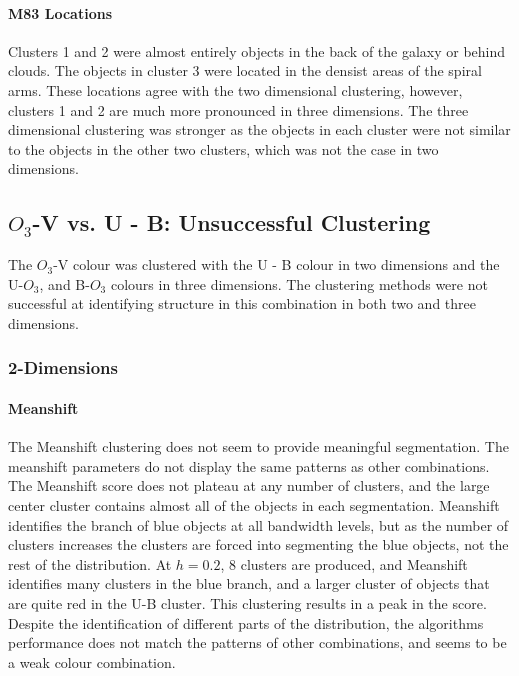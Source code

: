 \paragraph{M83 Locations}
Clusters 1 and 2 were almost entirely objects in the back of the galaxy or behind clouds.
The objects in cluster 3 were located in the densist areas of the spiral arms.
These locations agree with the two dimensional clustering, however, clusters 1 and 2 are much more pronounced in three dimensions.
The three dimensional clustering was stronger as the objects in each cluster were not similar to the objects in the other two clusters, which was not the case in two dimensions.

\subsection{$O_{3}$-V vs. U - B: Unsuccessful Clustering}
The $O_{3}$-V colour was clustered with the U - B colour in two dimensions and the U-$O_{3}$, and B-$O_{3}$ colours in three dimensions.
The clustering methods were not successful at identifying structure in this combination in both two and three dimensions.

\subsubsection{2-Dimensions}

\paragraph{Meanshift}
The Meanshift clustering does not seem to provide meaningful segmentation.
The meanshift parameters do not display the same patterns as other combinations. 
The Meanshift score does not plateau at any number of clusters, and the large center cluster contains almost all of the objects in each segmentation.
Meanshift identifies the branch of blue objects at all bandwidth levels, but as the number of clusters increases the clusters are forced into segmenting the blue objects, not the rest of the distribution.
At $h=0.2$, 8 clusters are produced, and Meanshift identifies many clusters in the blue branch, and a larger cluster of objects that are quite red in the U-B cluster.
This clustering results in a peak in the score.
Despite the identification of different parts of the distribution, the algorithms performance does not match the patterns of other combinations, and seems to be a weak colour combination. 

